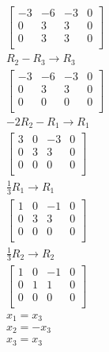 \documentclass[12pt letter]{report}
\begin{document}
{{\begin{enumerate}
\begin{align*}
\begin{bmatrix}
                -3 & -6 & -3 & 0 \\
                0  & 3  & 3  & 0 \\
                0  & 3  & 3  & 0 \\
              \end{bmatrix}
              \\
              R_2 - R_3  \rightarrow R_3   \\
              \begin{bmatrix}
                -3 & -6 & -3 & 0 \\
                0  & 3  & 3  & 0 \\
                0  & 0  & 0  & 0 \\
              \end{bmatrix}
              \\
              -2R_2 - R_1  \rightarrow R_1 \\
              \begin{bmatrix}
                3 & 0 & -3 & 0 \\
                0 & 3 & 3  & 0 \\
                0 & 0 & 0  & 0 \\
              \end{bmatrix}
              \\
              \frac{1}{3}R_1 \to R_1       \\
              \begin{bmatrix}
                1 & 0 & -1 & 0 \\
                0 & 3 & 3  & 0 \\
                0 & 0 & 0  & 0 \\
              \end{bmatrix}
              \\
              \frac{1}{3}R_2 \to R_2       \\
              \begin{bmatrix}
                1 & 0 & -1 & 0 \\
                0 & 1 & 1  & 0 \\
                0 & 0 & 0  & 0 \\
              \end{bmatrix}
              \\
              x_1 = x_3                    \\
              x_2 = -x_3                   \\
              x_3 = x_3                    \\

\end{align*}
\end{enumerate}}}
\end{document}
